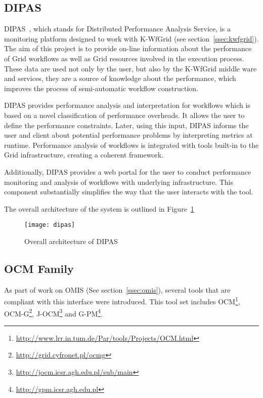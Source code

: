 
\subsection{DIPAS}

DIPAS~\cite{DIPAS}, which stands for Distributed Performance Analysis Service, is a monitoring platform designed to work with K-WfGrid (see section~\ref{ssec:kwfgrid}). The aim of this project is to provide on-line information about the performance of Grid workflows as well as Grid resources involved in the execution process. These data are used not only by the user, but also by the K-WfGrid middle ware and services, they are a source of knowledge about the performance, which improves the process of semi-automatic workflow construction.

DIPAS provides performance analysis and interpretation for workflows which is based on a novel classification of performance overheads. It allows the user to define the performance constraints. Later, using this input, DIPAS informs the user and client about potential performance problems by interpreting metrics at runtime. Performance analysis of workflows is integrated with tools built-in to the Grid infrastructure, creating a coherent framework.

Additionally, DIPAS provides a web portal for the user to conduct performance monitoring and analysis of workflows with underlying infrastructure. This component substantially simplifies the way that the user interacts with the tool.

The overall architecture of the system is outlined in Figure~\ref{fig:dipas}

\begin{figure}[ht]

\centering

\texttt{[image: dipas]} \caption{Overall architecture of DIPAS} \label{fig:dipas}

\end{figure}


\subsection{OCM Family}

As part of work on OMIS (See section~\ref{ssec:omis}), several tools that are compliant with this interface were introduced. This tool set includes OCM\footnote{\url{http://www.lrr.in.tum.de/Par/tools/Projects/OCM.html}}, OCM-G\footnote{\url{http://grid.cyfronet.pl/ocmg}}, J-OCM\footnote{\url{http://jocm.icsr.agh.edu.pl/sub/main}} and G-PM\footnote{\url{http://gpm.icsr.agh.edu.pl}}.

